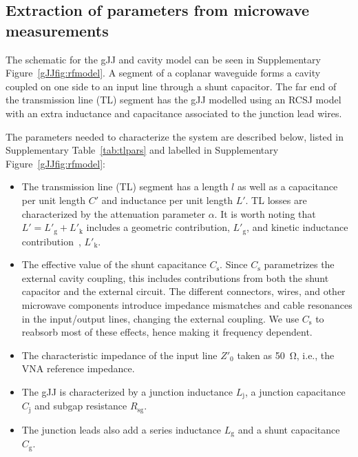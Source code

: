 \subsection{Extraction of parameters from microwave measurements}\label{sec:extraction}
\noindent The schematic for the gJJ and cavity model can be seen in Supplementary Figure~\ref{gJJfig:rfmodel}.
A segment of a coplanar waveguide forms a cavity coupled on one side to an input line through a shunt capacitor.
The far end of the transmission line (TL) segment has the gJJ modelled using an RCSJ model with an extra inductance and capacitance associated to the junction lead wires.

The parameters needed to characterize the system are described below, listed in Supplementary Table~\ref{tab:tlpars} and labelled in Supplementary Figure~\ref{gJJfig:rfmodel}:
\begin{itemize}
	\item The transmission line (TL) segment has a length $l$ as well as a capacitance per unit length $C'$ and inductance per unit length $L'$.
	TL losses are characterized by the attenuation parameter $\alpha$.
	It is worth noting that $L' = L'_\text{g} + L'_\text{k}$ includes a geometric contribution, $L'_\text{g}$, and kinetic inductance contribution~\cite{vanduzerPrinciplesSuperconductiveDevices1999}, $L'_\text{k}$.
	\item The effective value of the shunt capacitance $C_\text{s}$.
	Since $C_\text{s}$ parametrizes the external cavity coupling, this includes contributions from both the shunt capacitor and the external circuit.
	The different connectors, wires, and other microwave components introduce impedance mismatches and cable resonances in the input/output lines, changing the external coupling.
	We use $C_\text{s}$ to reabsorb most of these effects, hence making it frequency dependent.
	\item The characteristic impedance of the input line $Z'_0$ taken as \SI{50}{\ohm}, i.e., the VNA reference impedance.
	\item The gJJ is characterized by a junction inductance $L_\text{j}$, a junction capacitance $C_\text{j}$ and subgap resistance $R_\text{sg}$.
	\item The junction leads also add a series inductance $L_\text{g}$ and a shunt capacitance $C_\text{g}$.
\end{itemize}

